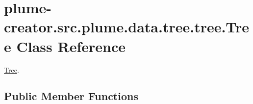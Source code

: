 \hypertarget{classplume-creator_1_1src_1_1plume_1_1data_1_1tree_1_1tree_1_1_tree}{}\section{plume-\/creator.src.\+plume.\+data.\+tree.\+tree.\+Tree Class Reference}
\label{classplume-creator_1_1src_1_1plume_1_1data_1_1tree_1_1tree_1_1_tree}


\hyperlink{classplume-creator_1_1src_1_1plume_1_1data_1_1tree_1_1tree_1_1_tree}{Tree}.  


\subsection*{Public Member Functions}
